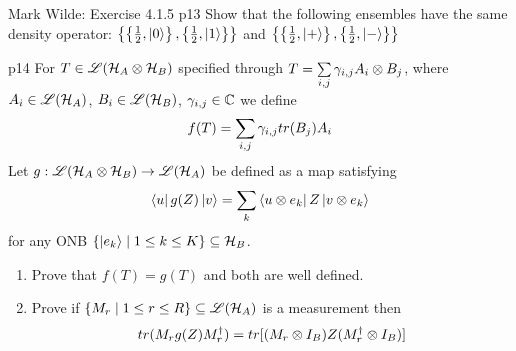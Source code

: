\documentclass[a4paper, 11pt]{article}
\begin{document}
\begin{problem}{%
		Mark Wilde: Exercise 4.1.5
	}{p13%
	}
	 Show that the following ensembles have the same density operator: $\left\{\left\{\frac12,\ket{0}\right\},\left\{\frac12,\ket{1}\right\}\right\}$ and $\left\{\left\{\frac12,\ket{+}\right\},\left\{\frac12,\ket{-}\right\}\right\}$
\end{problem}


\begin{problem}{%
	}{p14%
	}
	For $T\in {\mathscr{L}}(\mathcal{H}_A\otimes \mathcal{H}_B)$ specified through $T=\sum\limits_{i,j}\gamma_{i,j}A_i\otimes B_j$, where $A_i\in {\mathscr{L}}(\mathcal{H}_A)$, $B_i\in {\mathscr{L}}(\mathcal{H}_B)$, $\gamma_{i,j}\in \mathbb{C}$ we define $$f(T)=\sum_{i,j}\gamma_{i,j}tr(B_j)A_i$$Let $g:{\mathscr{L}}(\mathcal{H}_A\otimes \mathcal{H}_B) \to {\mathscr{L}}(\mathcal{H}_A)$ be defined as a map satisfying $$\bra{u}g(Z)\ket{v}=\sum_k\bra{u\otimes e_k}Z\ket{v\otimes e_k}$$ for any ONB $\{\ket{e_k}\mid 1\leq k\leq K\}\subseteq \mathcal{H}_B$. \begin{enumerate}
		\item Prove that $f(T)=g(T)$ and both are well defined. \parinn
		\item Prove if $\{M_r\mid 1\leq r\leq R\}\subseteq {\mathscr{L}}(\mathcal{H}_A)$ is a measurement then $$tr(M_rg(Z)M^{\dagger}_r)=tr[(M_r\otimes I_B)Z(M^{\dagger}_r\otimes I_B)]$$
	\end{enumerate}
\end{problem}
\end{document}

